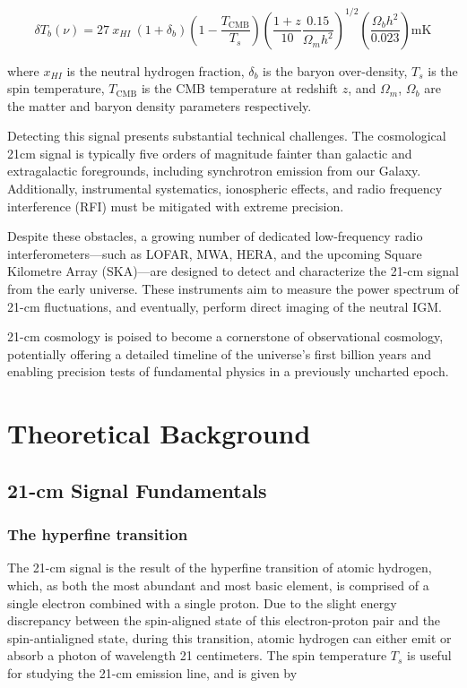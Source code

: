 \documentclass[floats,floatfix,showpacs,amssymb,prd,superscriptaddress,nofootinbib]{revtex4-2} %
\begin{document}
\begin{equation}
    \delta T_b (\nu) = 27 \ x_{HI} \ (1 + \delta_b) \left(1 - \frac{T_{\text{CMB}}}{T_s} \right) \left(\frac{1 + z}{10} \frac{0.15}{\Omega_m h^2} \right)^{1/2} \left( \frac{\Omega_b h^2}{0.023} \right) \text{mK}
    \label{eq:brightness_temperature}
\end{equation}

\noindent where $x_{HI}$ is the neutral hydrogen fraction, $\delta_b$ is the baryon over-density, $T_s$ is the spin temperature, $T_{\text{CMB}}$ is the CMB temperature at redshift $z$, and $\Omega_m$, $\Omega_b$ are the matter and baryon density parameters respectively.

Detecting this signal presents substantial technical challenges. The cosmological 21cm signal is typically five orders of magnitude fainter than galactic and extragalactic foregrounds, including synchrotron emission from our Galaxy. Additionally, instrumental systematics, ionospheric effects, and radio frequency interference (RFI) must be mitigated with extreme precision.

Despite these obstacles, a growing number of dedicated low-frequency radio interferometers—such as LOFAR, MWA, HERA, and the upcoming Square Kilometre Array (SKA)—are designed to detect and characterize the 21-cm signal from the early universe. These instruments aim to measure the power spectrum of 21-cm fluctuations, and eventually, perform direct imaging of the neutral IGM.

21-cm cosmology is poised to become a cornerstone of observational cosmology, potentially offering a detailed timeline of the universe's first billion years and enabling precision tests of fundamental physics in a previously uncharted epoch.

\newpage
\section{Theoretical Background}
\subsection{21-cm Signal Fundamentals}
\subsubsection{The hyperfine transition}
The 21-cm signal is the result of the hyperfine transition of atomic hydrogen, which, as both the most abundant and most basic element, is comprised of a single electron combined with a single proton. Due to the slight energy discrepancy between the spin-aligned state of this electron-proton pair and the spin-antialigned state, during this transition, atomic hydrogen can either emit or absorb a photon of wavelength 21 centimeters. The spin temperature $T_s$ is useful for studying the 21-cm emission line, and is given by \citep{Liu_Shaw_2020}
\end{document}
